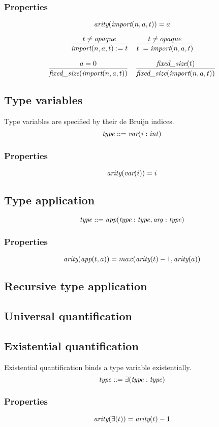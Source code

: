 \documentclass[a4paper]{report}
\newcommand\arity{{\ensuremath\textit{arity}}}
\newcommand\fixedsize{{\ensuremath\textit{fixed\_size}}}
\newcommand\tyImport{{\ensuremath\textit{import}}}
\newcommand\tyVar{{\ensuremath\textit{var}}}
\newcommand\tyApp{{\ensuremath\textit{app}}}
\begin{document}
\subsubsection*{Properties}
$$\arity(\tyImport(n, a, t)) = a$$

$$
{t \neq opaque
\over
\tyImport(n,a,t) := t}
\quad
{t \neq opaque
\over
t := \tyImport(n,a,t)}
$$

$$
{a=0 \over \fixedsize(\tyImport(n, a, t))}
\quad
{\fixedsize(t) \over \fixedsize(\tyImport(n, a, t))}
$$


\subsection{Type variables}
Type variables are specified by their de Bruijn indices.
$$
\it type ::= \tyVar(i : int)
$$

\subsubsection*{Properties}
$$\arity(\tyVar(i)) = i$$

\subsection{Type application}
$$
\it type ::= \tyApp(type : type, arg : type)
$$
\subsubsection*{Properties}
$$ \arity(\tyApp(t,a)) = max(\arity(t)-1, \arity(a)) $$

\subsection{Recursive type application}
\subsection{Universal quantification}
\subsection{Existential quantification}
Existential quantification binds a type variable existentially.
$$ \it type ::= \exists(type : type) $$

\subsubsection*{Properties}
$$ \arity(\exists(t)) = \arity(t)-1 $$
\end{document}
